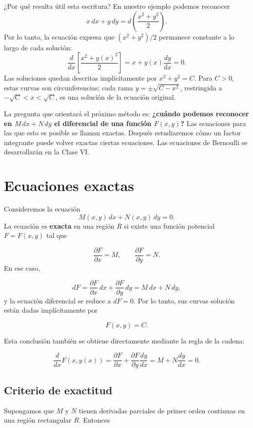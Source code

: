 \documentclass[12pt,a4paper]{article}
\begin{document}
	¿Por qué resulta útil esta escritura? En nuestro ejemplo podemos reconocer
	\[
	x\,dx+y\,dy
	=d\!\left(\frac{x^2+y^2}{2}\right).
	\]
	Por lo tanto, la ecuación expresa que \((x^2+y^2)/2\) permanece constante a lo largo de cada solución:
	\[
	\frac{d}{dx}\left[\frac{x^2+y(x)^2}{2}\right]
	=x+y(x)\frac{dy}{dx}=0.
	\]
	Las soluciones quedan descritas implícitamente por \(x^2+y^2=C\). Para \(C>0\), estas curvas son circunferencias; cada rama \(y=\pm\sqrt{C-x^2}\), restringida a \(-\sqrt C<x<\sqrt C\), es una solución de la ecuación original.

	La pregunta que orientará el próximo método es: \textbf{¿cuándo podemos reconocer en \(M\,dx+N\,dy\) el diferencial de una función \(F(x,y)\)?} Las ecuaciones para las que esto es posible se llaman exactas. Después estudiaremos cómo un factor integrante puede volver exactas ciertas ecuaciones. Las ecuaciones de Bernoulli se desarrollarán en la Clase VI.

	\clearpage
	\section{Ecuaciones exactas}

	Consideremos la ecuación
	\[
	M(x,y)\,dx+N(x,y)\,dy=0.
	\]
	La ecuación es \textbf{exacta} en una región \(R\) si existe una función potencial \(F=F(x,y)\) tal que

	\[
	\frac{\partial F}{\partial x}=M,
	\qquad
	\frac{\partial F}{\partial y}=N.
	\]
	En ese caso,

	\[
	dF
	=
	\frac{\partial F}{\partial x}\,dx
	+
	\frac{\partial F}{\partial y}\,dy
	=
	M\,dx+N\,dy,
	\]
	y la ecuación diferencial se reduce a \(dF=0\). Por lo tanto, sus curvas solución están dadas implícitamente por

	\[
	\boxed{F(x,y)=C.}
	\]

	Esta conclusión también se obtiene directamente mediante la regla de la cadena:

	\[
	\frac{d}{dx}F(x,y(x))
	=
	\frac{\partial F}{\partial x}
	+
	\frac{\partial F}{\partial y}\frac{dy}{dx}
	=
	M+N\frac{dy}{dx}
	=
	0.
	\]

	\subsection{Criterio de exactitud}

	Supongamos que \(M\) y \(N\) tienen derivadas parciales de primer orden continuas en una región rectangular \(R\). Entonces
\end{document}
